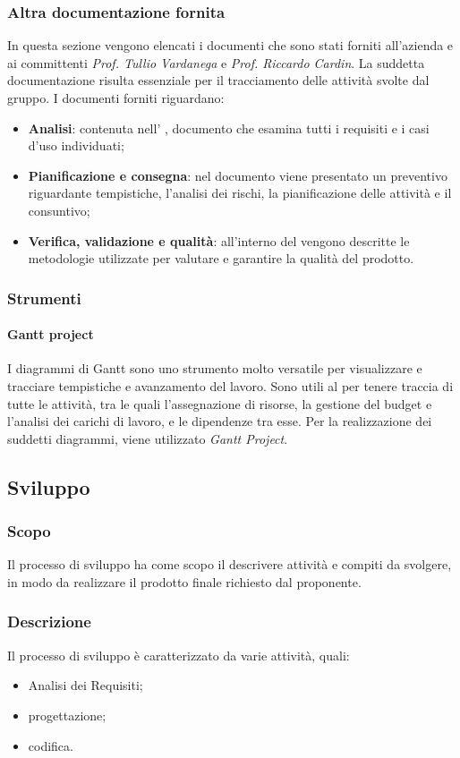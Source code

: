 \subsubsection{Altra documentazione fornita}
In questa sezione vengono elencati i documenti che sono stati forniti all'azienda \proponente{} e ai committenti \textit{Prof. Tullio Vardanega} e \textit{Prof. Riccardo Cardin}. La suddetta documentazione risulta essenziale per il tracciamento delle attività svolte dal gruppo.
I documenti forniti riguardano: 
\begin{itemize}
	\item \textbf{Analisi}: contenuta nell' \AdR{}, documento che esamina tutti i requisiti e i casi d'uso individuati;
	\item \textbf{Pianificazione e consegna}: nel documento \PdP{} viene presentato un preventivo riguardante tempistiche, l'analisi dei rischi, la pianificazione delle attività e il consuntivo;
	\item \textbf{Verifica, validazione e qualità}: all'interno del \PdQ{} vengono descritte le metodologie utilizzate per valutare e garantire la qualità del prodotto.
\end{itemize}
\subsubsection{Strumenti}
\paragraph{Gantt project}
I diagrammi di Gantt sono uno strumento molto versatile per visualizzare e tracciare tempistiche e avanzamento del lavoro. Sono utili al \RdP{} per tenere traccia di tutte le attività, tra le quali l'assegnazione di risorse, la gestione del budget e l'analisi dei carichi di lavoro, e le dipendenze tra esse. Per la realizzazione dei suddetti diagrammi, viene utilizzato \textit{Gantt Project}.
\subsection{Sviluppo}
\subsubsection{Scopo}
Il processo di sviluppo ha come scopo il descrivere attività e compiti da svolgere, in modo da realizzare il prodotto finale richiesto dal proponente.
\subsubsection{Descrizione}
Il processo di sviluppo è caratterizzato da varie attività, quali:
\begin{itemize}
	\item Analisi dei Requisiti;
	\item progettazione;
	\item codifica.
\end{itemize}
